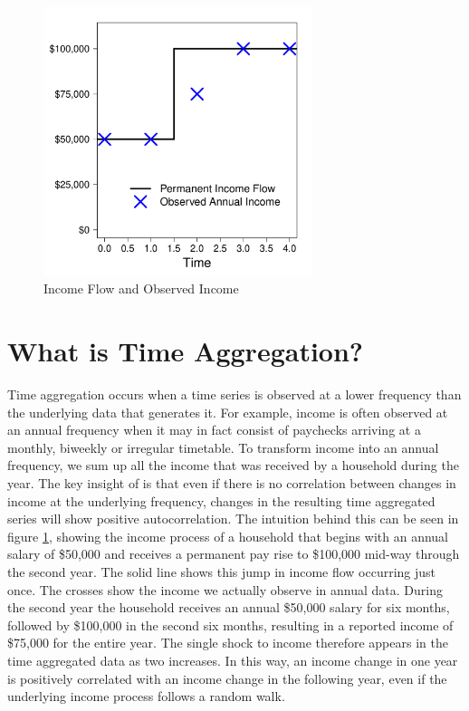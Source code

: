 \documentclass[AER]{AEA}
\begin{document}
\begin{figure}
	\includegraphics[width=0.7\textwidth]{../Code/Figures/TimeAgg_simple.pdf}
	\caption{Income Flow and Observed Income}
	\label{fig:TimeAggExample}
\end{figure}

\section{What is Time Aggregation?}

Time aggregation occurs when a time series is observed at a lower frequency than the underlying data that generates it. For example, income is often observed at an annual frequency when it may in fact consist of paychecks arriving at a monthly, biweekly or irregular timetable. To transform income into an annual frequency, we sum up all the income that was received by a household during the year. The key insight of \cite{working_note_1960} is that even if there is no correlation between changes in income at the underlying frequency, changes in the resulting time aggregated series will show positive autocorrelation. The intuition behind this can be seen in figure \ref{fig:TimeAggExample}, showing the income process of a household that begins with an annual salary of \$50,000 and receives a permanent pay rise to \$100,000 mid-way through the second year. The solid line shows this jump in income flow occurring just once. The crosses show the income we actually observe in annual data. During the second year the household receives an annual \$50,000 salary for six months, followed by \$100,000 in the second six months, resulting in a reported income of \$75,000 for the entire year. The single shock to income therefore appears in the time aggregated data as two increases. In this way, an income change in one year is positively correlated with an income change in the following year, even if the underlying income process follows a random walk.
\end{document}
